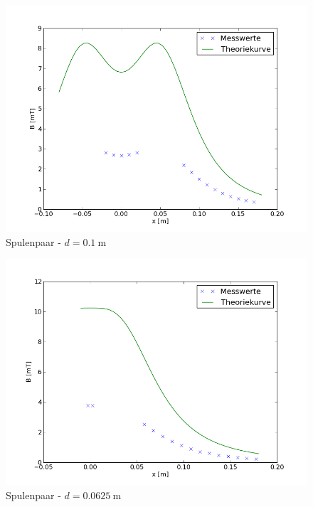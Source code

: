 \documentclass[11pt,ngerman,a4paper]{article}
\begin{document}
\begin{figure}[htp]
\centering
\includegraphics[scale=0.7]{e11.png}
\caption{Spulenpaar - $d =\SI{0.1}{\meter}$}
\label{plot1}
\end{figure}

\begin{figure}[htp]
\centering
\includegraphics[scale=0.7]{e12.png}
\caption{Spulenpaar - $d =\SI{0.0625}{\meter}$}
\label{hhspule}
\end{figure}
\end{document}
